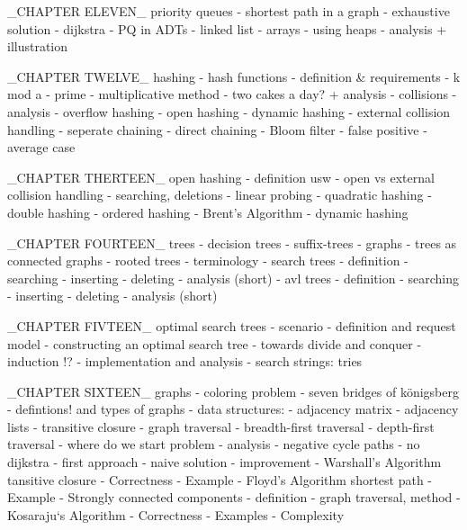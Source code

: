 \documentclass[openright,twoside,headsepline,bibtotoc]{scrbook}[2007/12/24]
\begin{document}
      	_CHAPTER ELEVEN_ priority queues
      	- shortest path in a graph
      	- exhaustive solution
      	- dijkstra
      	- PQ in ADTs
      		- linked list
      		- arrays
      	- using heaps
      		- analysis + illustration
      		
      	_CHAPTER TWELVE_ hashing
      	- hash functions
      		- definition & requirements
      		- k mod a
      		- prime
      		- multiplicative method
      		- two cakes a day? + analysis
      	- collisions
      		- analysis
      		- overflow hashing
      		- open hashing
      		- dynamic hashing
      	- external collision handling
      		- seperate chaining
      		- direct chaining
      	- Bloom filter
      		- false positive
      		- average case
      	
      	_CHAPTER THERTEEN_ open hashing
      	- definition usw
      	- open vs external collision handling
      	- searching, deletions
      	- linear probing
      	- quadratic hashing
      	- double hashing
      	- ordered hashing
      	- Brent's Algorithm
      	- dynamic hashing
      	
      	_CHAPTER FOURTEEN_ trees
      	- decision trees
      	- suffix-trees
      	- graphs
      		- trees as connected graphs
      		- rooted trees
      		- terminology
      	- search trees
      		- definition
      		- searching
      		- inserting
      		- deleting
      		- analysis (short)
      	- avl trees
      		- definition 
      		- searching
      		- inserting
      		- deleting
      		- analysis (short)
      	
      	_CHAPTER FIVTEEN_ optimal search trees
      	- scenario
      	- definition and request model
      	- constructing an optimal search tree
      	- towards divide and conquer
      	- induction !?
      	- implementation and analysis
      	- search strings: tries
      	
      	_CHAPTER SIXTEEN_ graphs
      	- coloring problem
      	- seven bridges of königsberg
      	- defintions! and types of graphs
      	- data structures:
      		- adjacency matrix
      		- adjacency lists
      	- transitive closure
      	- graph traversal
      		- breadth-first traversal
      		- depth-first traversal 
      		- where do we start problem
      		- analysis
      	- negative cycle paths
      		- no dijkstra
      		- first approach
      		- naive solution
      		- improvement
      		- Warshall's Algorithm  tansitive closure
      			- Correctness
      			- Example
      		- Floyd's Algorithm 	shortest path
      			- Example
      		- Strongly connected components
      			- definition
      			- graph traversal, method
      			- Kosaraju‘s Algorithm
      				- Correctness
      				- Examples
      				- Complexity
      		
\end{document}
